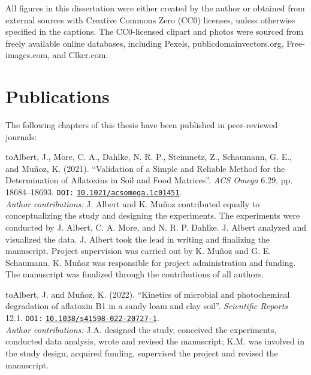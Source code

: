 All figures in this dissertation were either created by the author or obtained from external sources with Creative Commons Zero (CC0) licenses, unless otherwise specified in the captions. The CC0-licensed clipart and photos were sourced from freely available online databases, including Pexels, publicdomainvectors.org, Free-images.com, and Clker.com.

\section*{Publications}

The following chapters of this thesis have been published in peer-reviewed journals:

{\parindent2cm \hangindent\parindent\noindent\hbox toAlbert, J., More, C. A., Dahlke, N. R. P., Steinmetz, Z., Schaumann, G. E., and Muñoz, K. (2021). “Validation of a Simple and Reliable Method for the Determination of Aflatoxins in Soil and Food Matrices”. \textit{ACS Omega} 6.29, pp. 18684–18693. \texttt{DOI:} \href{https://pubs.acs.org/doi/10.1021/acsomega.1c01451}{\texttt{10.1021/acsomega.1c01451}}. \nocite{albert2021validation} \\[5pt]
\textit{Author contributions:}  J. Albert and K. Muñoz contributed equally to conceptualizing the study and designing the experiments. The experiments were conducted by J. Albert, C. A. More, and N. R. P. Dahlke. J. Albert analyzed and visualized the data. J. Albert took the lead in writing and finalizing the manuscript. Project supervision was carried out by K. Muñoz and G. E. Schaumann. K. Muñoz was responsible for project administration and funding. The manuscript was finalized through the contributions of all authors. \par} 


{\parindent2cm \hangindent\parindent\noindent\hbox toAlbert, J. and Muñoz, K. (2022). “Kinetics of microbial and photochemical degradation of aflatoxin B1 in a sandy loam and clay soil”. \textit{Scientific Reports} 12.1. \texttt{DOI:} \href{https://www.nature.com/articles/s41598-022-20727-1}{\texttt{10.1038/s41598-022-20727-1}}. \nocite{albert2022kinetics}\\[5pt]
\textit{Author contributions:}  J.A. designed the study, conceived the experiments, conducted data analysis, wrote and revised the manuscript; K.M. was involved in the study design, acquired funding, supervised the project and revised the manuscript. \par}


